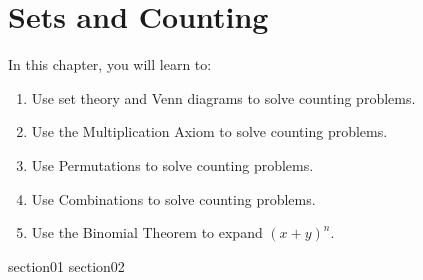\chapter{Sets and Counting}

In this chapter, you will learn to:
\begin{enumerate}
    \item Use set theory and Venn diagrams to solve counting problems.
    \item Use the Multiplication Axiom to solve counting problems.
    \item Use Permutations to solve counting problems.
    \item Use Combinations to solve counting problems.
    \item Use the Binomial Theorem to expand $(x + y)^n$.
\end{enumerate}

{section01}
{section02}
